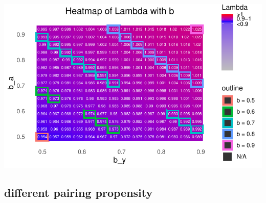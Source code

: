 \documentclass[
  letterpaper,
  DIV=11,
  numbers=noendperiod]{scrartcl}
\begin{document}
\includegraphics{sensitivity_files/figure-pdf/unnamed-chunk-8-1.pdf}

\subsection{different pairing
propensity}\label{different-pairing-propensity}
\end{document}
